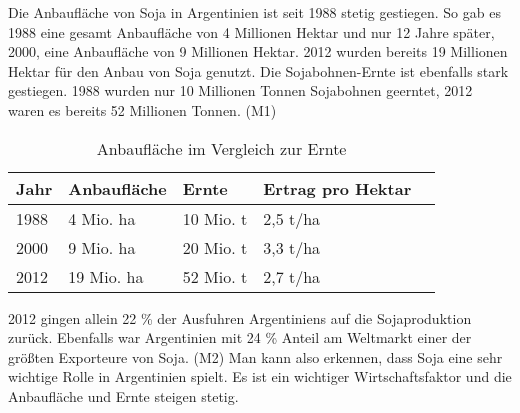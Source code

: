 \documentclass[./entry.tex]{subfiles}
\begin{document}
    Die Anbaufläche von Soja in Argentinien ist seit 1988 stetig
    gestiegen. So gab es 1988 eine gesamt Anbaufläche von 4 Millionen
    Hektar und nur 12 Jahre später, 2000, eine Anbaufläche von 9
    Millionen Hektar. 2012 wurden bereits 19 Millionen Hektar für den
    Anbau von Soja genutzt.
    Die Sojabohnen-Ernte ist ebenfalls stark gestiegen. 1988 wurden
    nur 10 Millionen Tonnen Sojabohnen geerntet, 2012 waren es bereits
    52 Millionen Tonnen. (M1)

    \begin{table}[h]
        \centering
        \begin{tabular}{|l|l|l|l|l|}
            \hline
            \textbf{Jahr} & \textbf{Anbaufläche} & \textbf{Ernte} & \textbf{Ertrag pro Hektar} \\ \hline
            1988          & 4 Mio. ha            & 10 Mio. t      & 2,5 t/ha                   \\ \hline
            2000          & 9 Mio. ha            & 20 Mio. t      & 3,3 t/ha                   \\ \hline
            2012          & 19 Mio. ha           & 52 Mio. t      & 2,7 t/ha                   \\ \hline
        \end{tabular}
        \caption{Anbaufläche im Vergleich zur Ernte}
        \label{tab:table1}
    \end{table}

    2012 gingen allein 22 \% der Ausfuhren Argentiniens auf die
    Sojaproduktion zurück. Ebenfalls war Argentinien mit 24 \%
    Anteil am Weltmarkt einer der größten Exporteure von Soja. (M2)
    Man kann also erkennen, dass Soja eine sehr wichtige Rolle in
    Argentinien spielt. Es ist ein wichtiger Wirtschaftsfaktor und
    die Anbaufläche und Ernte steigen stetig.
\end{document}
